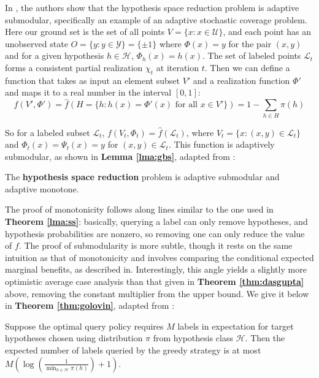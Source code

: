 In \cite{Golovin}, the authors show that the hypothesis space reduction problem is adaptive submodular, specifically an example of an adaptive stochastic coverage problem. Here our ground set is the set of all points $V = \{x : x \in \mathcal{U}\}$, and each point has an unobserved state $O = \{y : y \in \mathcal{Y}\} = \{\pm1\}$ where $\Phi(x) = y$ for the pair $(x,y)$ and for a given hypothesis $h \in \mathcal{H}$, $\Phi_h(x) = h(x)$. The set of labeled points $\mathcal{L}_t$ forms a consistent partial realization $\chi_t$ at iteration $t$. Then we can define a function that takes as input an element subset $V'$ and a realization function $\Phi'$ and maps it to a real number in the interval $[0,1]$:
\[
f(V', \Phi') = \hat{f}(H = \{h : h(x) = \Phi'(x) \mbox{ for all } x \in V'\}) = 1 - \sum_{h \in H} \pi(h)
\]

\noindent So for a labeled subset $\mathcal{L}_t$, $f(V_t, \Phi_t) = \hat{f}(\mathcal{L}_t)$, where $V_t = \{ x : (x,y) \in \mathcal{L}_t \}$ and $\Phi_t(x) = \Psi_t(x) = y$ for $(x, y) \in \mathcal{L}_t$. This function is adaptively submodular, as shown in \textbf{Lemma \ref{lma:gbs}}, adapted from \cite{Golovin}:\\

\begin{lemma}
\label{lma:gbs}
The \textbf{hypothesis space reduction} problem is adaptive submodular and adaptive monotone.
\end{lemma}

\noindent The proof of monotonicity follows along lines similar to the one used in \textbf{Theorem \ref{lma:ss}}: basically, querying a label can only remove hypotheses, and hypothesis probabilities are nonzero, so removing one can only reduce the value of $f$. The proof of submodularity is more subtle, though it rests on the same intuition as that of monotonicity and involves comparing the conditional expected marginal benefits, as described in. Interestingly, this angle yields a slightly more optimistic average case analysis than that given in \textbf{Theorem \ref{thm:dasgupta}} above, removing the constant multiplier from the upper bound. We give it below in \textbf{Theorem \ref{thm:golovin}}, adapted from \cite{Golovin}:\\

\begin{theorem}
\label{thm:golovin}
Suppose the optimal query policy requires $M$ labels in expectation for target hypotheses chosen using distribution $\pi$ from hypothesis class $\mathcal{H}$. Then the expected number of labels queried by the greedy strategy is at most $M \left(\log \left(\frac{1}{\min_{h \in \mathcal{H}} \pi(h)}\right) + 1\right)$.
\end{theorem}

